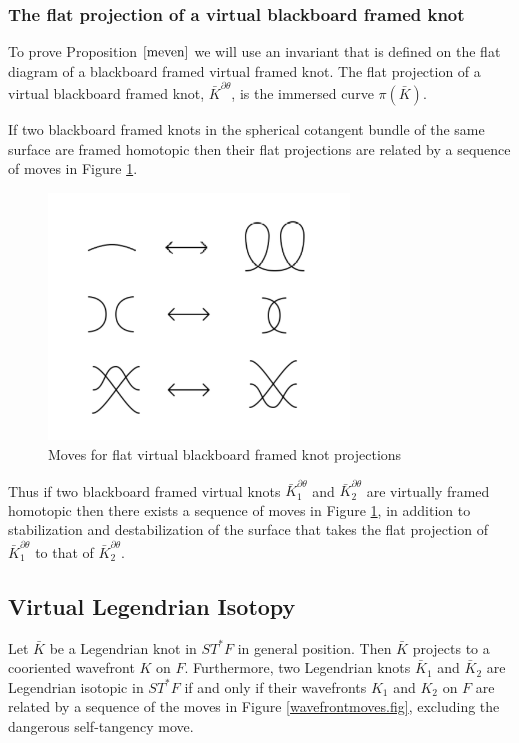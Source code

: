  

\subsubsection{The flat projection of a virtual blackboard framed knot}
To prove Proposition $\ref{meven}$ we will use an invariant that is defined on the flat diagram of a blackboard framed virtual framed knot.  The flat projection of a virtual blackboard framed knot, $\bar{K}^{\partial \theta}$, is the immersed curve $\pi(\bar{K})$.

If two blackboard framed knots in the spherical cotangent bundle of the same surface are framed homotopic then their flat projections are related by a sequence of moves in Figure \ref{flatBlackboardFrontMoves.fig}.

\begin{figure}[htbp]
	\centering
	\includegraphics[width=8cm]{flatBlackboardFrontMoves}
	\caption{Moves for flat virtual blackboard framed knot projections}
	\label{flatBlackboardFrontMoves.fig}
\end{figure}

Thus if two blackboard framed virtual knots $\bar{K}_1^{\partial \theta}$ and $\bar{K}_2^{\partial \theta}$ are virtually framed homotopic then there exists a sequence of moves in Figure \ref{flatBlackboardFrontMoves.fig}, in addition to stabilization and destabilization of the surface that takes the flat projection of $\bar{K}_1^{\partial \theta}$ to that of $\bar{K}_2^{\partial \theta}$.


\subsection{Virtual Legendrian Isotopy}\label{defvirtlegiso}
Let $\bar{K}$ be a Legendrian knot in $ST^*F$ in general position.  Then $\bar{K}$ projects to a cooriented wavefront $K$ on $F$.  Furthermore, two Legendrian knots $\bar{K}_1$ and $\bar{K}_2$ are Legendrian isotopic in $ST^*F$ if and only if their wavefronts $K_1$ and $K_2$ on $F$ are related by a sequence of the moves in Figure \ref{wavefrontmoves.fig}, excluding the dangerous self-tangency move.  


